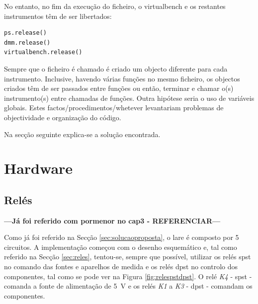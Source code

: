No entanto, no fim da execução do ficheiro, o \acrshort{virtualbench} e os restantes instrumentos têm de ser libertados:
\begin{center}
	\begin{minipage}{0.75\linewidth}
		\begin{lstlisting}[language=Python, caption=Libertar instrumentos e \acrshort{virtualbench}, label=lst:libertarinstrumentos]
ps.release()
dmm.release()
virtualbench.release()
\end{lstlisting}
	\end{minipage}
\end{center}

Sempre que o ficheiro é chamado é criado um objecto diferente para cada instrumento. Inclusive, havendo várias funções no mesmo ficheiro, os objectos criados têm de ser passados entre funções ou então, terminar e chamar o(s) instrumento(s) entre chamadas de funções. Outra hipótese seria o uso de variáveis globais. Estes factos/procedimentos/whetever levantariam problemas de objectividade e organização do código.

Na secção seguinte explica-se a solução encontrada.

\section{Hardware}
\subsection{Relés}
\label{sec:hwreles}

\textbf{---Já foi referido com pormenor no cap3 - REFERENCIAR---}

Como já foi referido na Secção \ref{sec:solucaoproposta}, o \acrshort{lare} é composto por 5 circuitos. A implementação começou com o desenho esquemático e, tal como referido na Secção \ref{sec:reles}, tentou-se, sempre que possível, utilizar os relés \acrshort{spst} no comando das fontes e aparelhos de medida e os relés \acrshort{dpst} no controlo dos componentes, tal como se pode ver na Figura \ref{fig:relespstdpst}. O relé \textit{K4} - \acrshort{spst} - comanda a fonte de alimentação de \SI{5}{\volt} e os relés \textit{K1} a \textit{K3} - \acrshort{dpst} - comandam os componentes.

